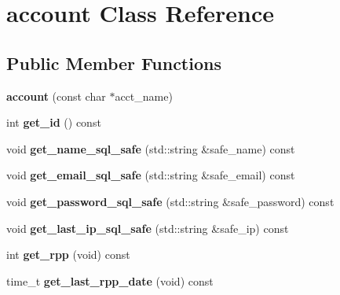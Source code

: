 \hypertarget{classaccount}{\section{account Class Reference}
\label{classaccount}
}
\subsection*{Public Member Functions}
\begin{DoxyCompactItemize}
\item 
\hypertarget{classaccount_a7f9fc489391ffeeb0ac8b3edbd896852}{{\bfseries account} (const char $\ast$acct\-\_\-name)}\label{classaccount_a7f9fc489391ffeeb0ac8b3edbd896852}

\item 
\hypertarget{classaccount_a0013a4b341ccb94d950b58dc9e40370c}{int {\bfseries get\-\_\-id} () const }\label{classaccount_a0013a4b341ccb94d950b58dc9e40370c}

\item 
\hypertarget{classaccount_a55c4677963ad0cbad3df2ae17da15db0}{void {\bfseries get\-\_\-name\-\_\-sql\-\_\-safe} (std\-::string \&safe\-\_\-name) const }\label{classaccount_a55c4677963ad0cbad3df2ae17da15db0}

\item 
\hypertarget{classaccount_a4aefad9867c8cb9393563f65c2956333}{void {\bfseries get\-\_\-email\-\_\-sql\-\_\-safe} (std\-::string \&safe\-\_\-email) const }\label{classaccount_a4aefad9867c8cb9393563f65c2956333}

\item 
\hypertarget{classaccount_a2c96518fefa89811fe96c5778c300acd}{void {\bfseries get\-\_\-password\-\_\-sql\-\_\-safe} (std\-::string \&safe\-\_\-password) const }\label{classaccount_a2c96518fefa89811fe96c5778c300acd}

\item 
\hypertarget{classaccount_a5693551c1a997ccf3b8ac3a627c2782d}{void {\bfseries get\-\_\-last\-\_\-ip\-\_\-sql\-\_\-safe} (std\-::string \&safe\-\_\-ip) const }\label{classaccount_a5693551c1a997ccf3b8ac3a627c2782d}

\item 
\hypertarget{classaccount_acd67b6a6eabbbe2e666f86ee74795a8f}{int {\bfseries get\-\_\-rpp} (void) const }\label{classaccount_acd67b6a6eabbbe2e666f86ee74795a8f}

\item 
\hypertarget{classaccount_a45f9b78f6ce59aa596d550cc6c68c15a}{time\-\_\-t {\bfseries get\-\_\-last\-\_\-rpp\-\_\-date} (void) const }\label{classaccount_a45f9b78f6ce59aa596d550cc6c68c15a}


\end{DoxyCompactItemize}

